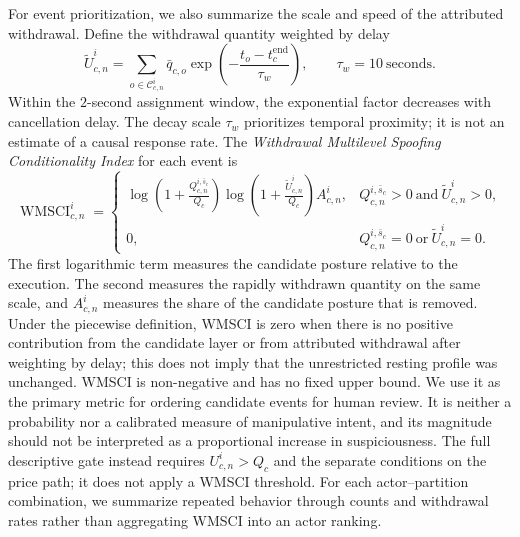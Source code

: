\documentclass[11pt]{article}
\newenvironment{review}{\begingroup\color{blue}}{\endgroup}
\begin{document}
For event prioritization, we also summarize the scale and speed of the attributed withdrawal. Define \begin{review}the withdrawal quantity weighted by delay\end{review}
\begin{equation}
    \widetilde U^{i}_{c,n}
    =
    \sum_{o\in\mathcal{C}_{c,n}^{i}}
    \bar q_{c,o}\exp\!\left(-\frac{t_o-t_c^{\mathrm{end}}}{\tau_w}\right),
    \qquad \tau_w=10\ \text{seconds}.
    \label{eq:delay_weighted_withdrawal}
\end{equation}
Within the $2$-second assignment window, the exponential factor decreases with cancellation delay. The decay scale
$\tau_w$ prioritizes temporal proximity; it is not an estimate of a causal response rate.
\begin{review}The \textit{Withdrawal Multilevel Spoofing Conditionality Index} for each event\end{review} is
\begin{equation}
    \operatorname{WMSCI}^{i}_{c,n}
    =
    \begin{cases}
    \displaystyle
    \log\!\left(1+\frac{Q^{i,\bar{s}_c}_{c,n}}{Q_c}\right)
    \log\!\left(1+\frac{\widetilde U^{i}_{c,n}}{Q_c}\right)
    A^{i}_{c,n},
    & Q^{i,\bar{s}_c}_{c,n}>0\ \text{and}\ \widetilde U^{i}_{c,n}>0,\\[5pt]
    0,
    & Q^{i,\bar{s}_c}_{c,n}=0\ \text{or}\ \widetilde U^{i}_{c,n}=0.
    \end{cases}
    \label{eq:wmsci}
\end{equation}
The first logarithmic term measures the candidate posture relative to the execution. The second measures the
rapidly withdrawn quantity on the same scale, and $A^{i}_{c,n}$ measures the share of the candidate posture that is removed.
Under the piecewise definition, WMSCI is zero when \begin{review}there is no positive contribution from the candidate layer or from attributed withdrawal after weighting by delay\end{review}; this does not imply that the unrestricted resting profile was unchanged. WMSCI is non-negative
and has no fixed upper bound. We use it as the primary metric for ordering \begin{review}candidate events\end{review} for
human review. It is neither a probability nor a calibrated measure of manipulative intent, and its magnitude should not be
interpreted as a proportional increase in suspiciousness. The full descriptive gate instead requires
$U^{i}_{c,n}>Q_c$ and \begin{review}the separate conditions on the price path\end{review}; it does not apply a WMSCI threshold. \begin{review}For each actor--partition combination\end{review},
we summarize repeated behavior through counts and withdrawal rates rather than aggregating WMSCI into an actor ranking.
\end{document}
